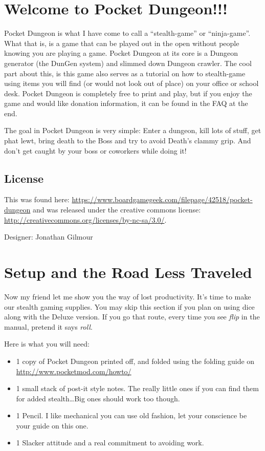 \documentclass[a6paper,hidelinks]{article}
\begin{document}
\tableofcontents

\section{Welcome to Pocket Dungeon!!!}
Pocket Dungeon is what I have come to call a ``stealth-game'' or ``ninja-game''. What that is, is a game that can be played out in the open without people knowing you are playing a game. Pocket Dungeon at its core is a Dungeon generator (the DunGen system) and slimmed down Dungeon crawler. The cool part about this, is this game also serves as a tutorial on how to stealth-game using items you will find (or would not look out of place) on your office or school desk. Pocket Dungeon is completely free to print and play, but if you enjoy the game and would like donation information, it can be found in the FAQ at the end.

The goal in Pocket Dungeon is very simple:  Enter a dungeon, kill lots of stuff, get phat lewt, bring death to the Boss and try to avoid Death's clammy grip. And don't get caught by your boss or coworkers while doing it!

\subsection{License}

This was found here: \url{https://www.boardgamegeek.com/filepage/42518/pocket-dungeon} and was released under the creative commons license: \url{http://creativecommons.org/licenses/by-nc-sa/3.0/}.

Designer: Jonathan Gilmour

\section{Setup and the Road Less Traveled}
Now my friend let me show you the way of lost productivity. It’s time to make our stealth gaming supplies. You may skip this section if you plan on using dice  along with the Deluxe version. If you go that route, every time you see {\em flip} in the manual, pretend it says {\em roll}.

Here is what you will need:

\begin{itemize}
  \item 1 copy of Pocket Dungeon printed off, and folded using the folding guide on \url{http://www.pocketmod.com/howto/}
  \item 1 small stack of post-it style notes. The really little ones if you can find them for added stealth\ldots Big ones should work too though.
  \item 1 Pencil. I like mechanical you can use old fashion, let your conscience be your guide on this one.
  \item 1 Slacker attitude and a real commitment to avoiding work.

\end{itemize}
\end{document}
